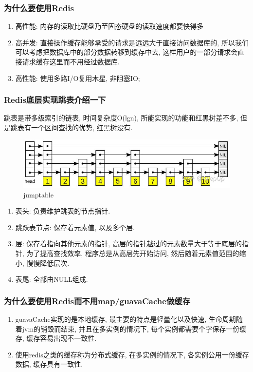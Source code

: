 \documentclass[UTF8]{ctexart}
\begin{document}
\subsubsection{为什么要使用Redis}
\begin{enumerate}
	\item 高性能: 内存的读取比硬盘乃至固态硬盘的读取速度都要快得多
	\item 高并发: 直接操作缓存能够承受的请求是远远大于直接访问数据库的, 所以我们可以考虑把数据库中的部分数据转移到缓存中去, 这样用户的一部分请求会直接请求缓存这里而不用经过数据库. 
	\item 高性能: 使用多路I/O复用木星, 非阻塞IO;
\end{enumerate}
\subsubsection{Redis底层实现跳表介绍一下}
跳表是带多级索引的链表, 时间复杂度O(lgn), 所能实现的功能和红黑树差不多, 但是跳表有一个区间查找的优势, 红黑树没有.
\begin{figure}
	\centering
	\includegraphics[width=0.7\linewidth]{figures/jump_table.jpg}
	\caption{jumptable}
	\label{fig:redissharding}
\end{figure}
\begin{enumerate}
	\item 表头: 负责维护跳表的节点指针.
	\item 跳跃表节点: 保存着元素值, 以及多个层.
	\item 层: 保存着指向其他元素的指针, 高层的指针越过的元素数量大于等于底层的指针, 为了提高查找效率, 程序总是从高层先开始访问, 然后随着元素值范围的缩小, 慢慢降低层次.
	\item 表尾: 全部由NULL组成.
\end{enumerate}

\subsubsection{为什么要使用Redis而不用map/guavaCache做缓存}
\begin{enumerate}
	\item guavaCache实现的是本地缓存, 最主要的特点是轻量化以及快速, 生命周期随着jvm的销毁而结束, 并且在多实例的情况下, 每个实例都需要个字保存一份缓存, 缓存容易出现不一致性.
	\item 使用redis之类的缓存称为分布式缓存, 在多实例的情况下, 各实例公用一份缓存数据, 缓存具有一致性.
\end{enumerate}
\end{document}
